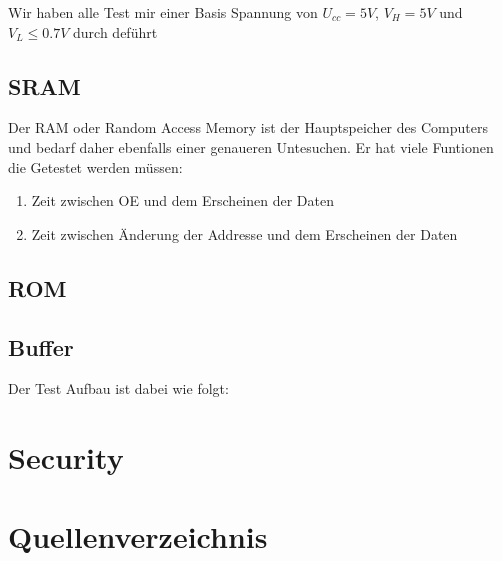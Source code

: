 \documentclass{scrartcl}
\begin{document}
Wir haben alle Test mir einer Basis Spannung von $U_{cc} = 5V$, $V_H = 5V$ und $V_L \leq 0.7V$ durch deführt

\subsection{SRAM}
Der RAM oder Random Access Memory ist der Hauptspeicher des Computers und bedarf daher ebenfalls einer genaueren Untesuchen. Er hat viele Funtionen die Getestet werden müssen:
\begin{enumerate} 
\item Zeit zwischen OE und dem Erscheinen der Daten
\item Zeit zwischen Änderung der Addresse und dem Erscheinen der Daten
\end{enumerate}

\subsection{ROM}

\subsection{Buffer}

Der Test Aufbau ist dabei wie folgt:

\section{\label{security}Security}

\section{Quellenverzeichnis}

\printbibliography{}
\end{document}
